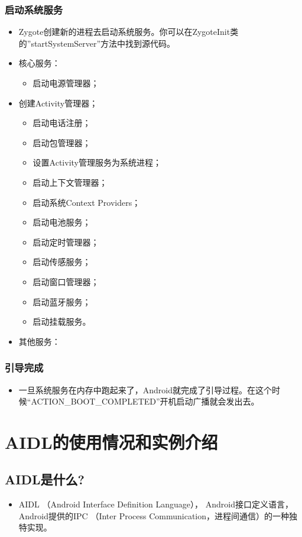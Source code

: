 \documentclass[9pt, b5paper]{article}
\begin{document}
\subsubsection{启动系统服务}
\label{sec-5-0-5}
\begin{itemize}
\item Zygote创建新的进程去启动系统服务。你可以在ZygoteInit类的”startSystemServer”方法中找到源代码。
\item 核心服务：
\begin{itemize}
\item 启动电源管理器；　
\end{itemize}
\item 创建Activity管理器；　
\begin{itemize}
\item 启动电话注册；　
\item 启动包管理器；
\item 设置Activity管理服务为系统进程；
\item 启动上下文管理器；
\item 启动系统Context Providers；
\item 启动电池服务；
\item 启动定时管理器；
\item 启动传感服务；
\item 启动窗口管理器；
\item 启动蓝牙服务；
\item 启动挂载服务。
\end{itemize}
\item 其他服务：
\end{itemize}
\subsubsection{引导完成}
\label{sec-5-0-6}
\begin{itemize}
\item 一旦系统服务在内存中跑起来了，Android就完成了引导过程。在这个时候“ACTION\_BOOT\_COMPLETED”开机启动广播就会发出去。
\end{itemize}

\section{AIDL的使用情况和实例介绍}
\label{sec-6}
\subsection{AIDL是什么?}
\label{sec-6-1}
\begin{itemize}
\item AIDL （Android Interface Definition Language）， Android接口定义语言，Android提供的IPC （Inter Process Communication，进程间通信）的一种独特实现。
\end{itemize}
\end{document}
